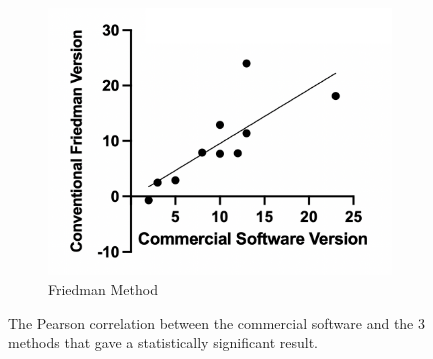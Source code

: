 \begin{figure}
\begin{center}
\begin{subfigure}[b]{0.30\linewidth}
		\end{subfigure}
		\begin{subfigure}[b]{0.30\linewidth}
			\includegraphics[width=\linewidth]{figures/friedman.png}
			\caption{Friedman Method}
		\end{subfigure}
		\caption{\label{fig:correl}The Pearson correlation between the commercial software and the 3 methods that gave a statistically significant result.}
	\end{center}
\end{figure}
